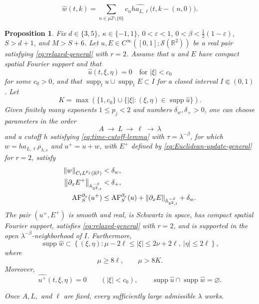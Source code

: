 \documentclass[10pt,a4paper]{amsart}
\newtheorem{proposition}{Proposition}
\newcommand{\A}{\mathbb A}
\newcommand{\R}{\mathbb R}
\newcommand{\Z}{\mathbb Z}
\newcommand{\abs}[1]{\left\lvert #1\right\rvert}
\newcommand{\eps}{\varepsilon}
\newcommand{\la}{\lambda}
\newcommand{\norm}[1]{\left\lVert #1\right\rVert}
\newcommand{\supp}{\operatorname{supp}}
\begin{document}
\begin{equation}\label{eq:Euclidean-mixed-w-Fourier}
 \widehat w(t,k)
 =\sum_{n\in\mu\Z\setminus\{0\}}c_n
    \widehat{h a_{L,\ell}}\bigl(t,k-(n,0)\bigr).
\end{equation}

\begin{proposition}\label{prop:Euclidean-onestep}
Fix $d\in\{3,5\}$, $\kappa\in\{-1,1\}$,
$0<\eps<1$, $0<\beta<\frac12(1-\eps)$, $S>d+1$, and $M>S+6$.
Let $u,E\in C^\infty([0,1];\mathcal S(\R^2))$ be a real pair satisfying
\eqref{eq:relaxed-general} with $r=2$.  Assume that $u$ and $E$ have compact spatial
Fourier support and that
\[
  \widehat u(t,\xi,\eta)=0\quad\text{for }\abs\xi<c_0
\]
for some $c_0>0$, and that
$\supp_tu\cup\supp_tE\subset I$ for a closed interval $I\Subset(0,1)$.
Let
\[
 K=\max\left(\{1,c_0\}\cup
 \{\abs\xi:(\xi,\eta)\in\supp\widehat u\}\right).
\]
Given finitely many exponents $1\leq p_j<2$ and numbers
$\delta_w,\delta_+>0$, one can choose parameters in the order
\[
 A\ \longrightarrow\ L\ \longrightarrow\ \ell\ \longrightarrow\ \la
\]
and a cutoff $h$ satisfying \eqref{eq:time-cutoff-lemma} with
$\tau=\la^{-\beta}$, for which $w=h a_{L,\ell}\rho_{\la,\eps}$ and
$u^+=u+w$, with $E^+$ defined by
\eqref{eq:Euclidean-update-general} for $r=2$, satisfy
\begin{align}
 \norm w_{C_tL^{p_j}(\R^2)}&<\delta_w,
 \label{eq:Euclidean-onestep-Lp}\\
 \norm{\partial_xE^+}_{\A^{-S}_{\R^2,t}}&<\delta_+,
 \notag\\
 \operatorname{AF}^{\partial_x}_S(u^+)
 &\leq\operatorname{AF}^{\partial_x}_S(u)
       +\norm{\partial_xE}_{\A^{-S}_{\R^2,t}}+\delta_w.
 \label{eq:Euclidean-onestep-absolute}
\end{align}
The pair $(u^+,E^+)$ is smooth and real, is Schwartz in space, has compact
spatial Fourier support, satisfies \eqref{eq:relaxed-general} with
$r=2$, and is
supported in the open $\la^{-\beta}$-neighborhood of $I$.  Furthermore,
\begin{equation}\label{eq:Euclidean-onestep-support}
 \supp\widehat w\subset
 \left\{(\xi,\eta):
   \mu-2\ell\leq\abs\xi\leq2\nu+2\ell,
   \ \abs\eta\leq2\ell\right\},
\end{equation}
where
\begin{equation}\label{eq:Euclidean-onestep-separation}
 \mu\geq8\ell,
 \qquad \mu>8K.
\end{equation}
Moreover,
\[
 \widehat{u^+}(t,\xi,\eta)=0\qquad(\abs\xi<c_0),
 \qquad
 \supp\widehat u\cap\supp\widehat w=\varnothing.
\]

Once $A,L,$ and $\ell$ are fixed, every sufficiently large admissible
$\la$ works.
\end{proposition}
\end{document}
